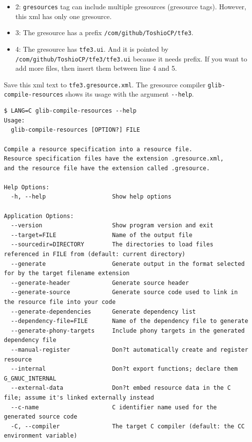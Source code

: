 \begin{itemize}
\tightlist
\item
  2: \passthrough{\lstinline!gresources!} tag can include multiple
  gresources (gresource tags). However, this xml has only one gresource.
\item
  3: The gresource has a prefix
  \passthrough{\lstinline!/com/github/ToshioCP/tfe3!}.
\item
  4: The gresource has \passthrough{\lstinline!tfe3.ui!}. And it is
  pointed by \passthrough{\lstinline!/com/github/ToshioCP/tfe3/tfe3.ui!}
  because it needs prefix. If you want to add more files, then insert
  them between line 4 and 5.
\end{itemize}

Save this xml text to \passthrough{\lstinline!tfe3.gresource.xml!}. The
gresource compiler \passthrough{\lstinline!glib-compile-resources!}
shows its usage with the argument \passthrough{\lstinline!--help!}.

\begin{lstlisting}
$ LANG=C glib-compile-resources --help
Usage:
  glib-compile-resources [OPTION?] FILE

Compile a resource specification into a resource file.
Resource specification files have the extension .gresource.xml,
and the resource file have the extension called .gresource.

Help Options:
  -h, --help                   Show help options

Application Options:
  --version                    Show program version and exit
  --target=FILE                Name of the output file
  --sourcedir=DIRECTORY        The directories to load files referenced in FILE from (default: current directory)
  --generate                   Generate output in the format selected for by the target filename extension
  --generate-header            Generate source header
  --generate-source            Generate source code used to link in the resource file into your code
  --generate-dependencies      Generate dependency list
  --dependency-file=FILE       Name of the dependency file to generate
  --generate-phony-targets     Include phony targets in the generated dependency file
  --manual-register            Don?t automatically create and register resource
  --internal                   Don?t export functions; declare them G_GNUC_INTERNAL
  --external-data              Don?t embed resource data in the C file; assume it's linked externally instead
  --c-name                     C identifier name used for the generated source code
  -C, --compiler               The target C compiler (default: the CC environment variable)
\end{lstlisting}

